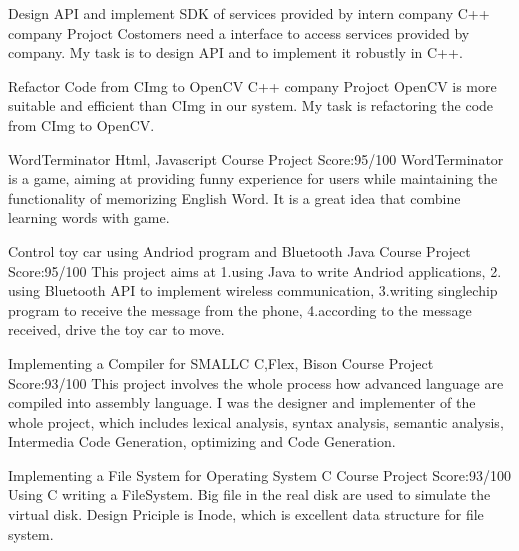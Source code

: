 \documentclass[11pt,a4paper]{moderncv}
\begin{document}
\vspace*{0.2\baselineskip}
{Design API and implement SDK of services provided by intern company}
{C++}
{company Projoct}
{}
{
Costomers need a interface to access services provided by company. My task is to design API and to implement it robustly in C++. 
}

\vspace*{0.2\baselineskip}
{Refactor Code from CImg to OpenCV}
{C++}
{company Projoct}
{}
{
OpenCV is more suitable and efficient than CImg in our system. My task is refactoring the code from CImg to OpenCV.
}

\vspace*{0.2\baselineskip}
{WordTerminator}
{Html, Javascript}
{Course Project}
{Score:95/100}
{
WordTerminator is a game, aiming at providing funny experience for users while maintaining the functionality of memorizing English Word.
It is a great idea that combine learning words with game.\\
}

\vspace*{0.2\baselineskip}
{Control toy car using Andriod program and Bluetooth}
{Java}
{Course Project}
{Score:95/100}
{
This project aims at 1.using Java to write Andriod applications, 2. using Bluetooth API to implement wireless communication, 3.writing singlechip program to receive the message from the phone, 4.according to the message received, drive the toy car to move.\\
}

\vspace*{0.2\baselineskip}
{Implementing a Compiler for SMALLC}
{C,Flex, Bison}
{Course Project}
{Score:93/100}
{
This project involves the whole process how advanced language are compiled into assembly language.
I was the designer and implementer of the whole project, which includes lexical analysis, syntax analysis,
semantic analysis, Intermedia Code Generation, optimizing and Code Generation.\\
}

{Implementing a File System for Operating System}
{C}
{Course Project}
{Score:93/100}
{
Using C writing a FileSystem. Big file in the real disk are used to simulate the virtual disk. Design Priciple is Inode, which is excellent data structure for file system.\\
}
\end{document}
